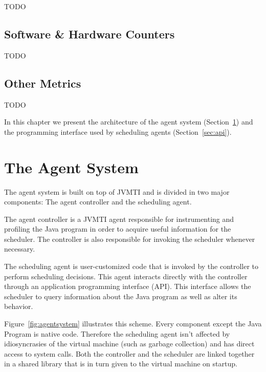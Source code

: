
TODO

\subsection{Software \& Hardware Counters}

TODO

\subsection{Other Metrics}


TODO

\iffalse
In this chapter we present the architecture of the agent system (Section~\ref{sec:agentsystem}) and the programming interface used by scheduling agents (Section~\ref{sec:api}).

\section{The Agent System} \label{sec:agentsystem}

The agent system is built on top of JVMTI and is divided in two major components: The agent controller and the scheduling agent.

The agent controller is a JVMTI agent responsible for instrumenting and profiling the Java program in order to acquire useful information for the scheduler. The controller is also responsible for invoking the scheduler whenever necessary.

The scheduling agent is user-customized code that is invoked by the controller to perform scheduling decisions. This agent interacts directly with the controller through an application programming interface (API). This interface allows the scheduler to query information about the Java program as well as alter its behavior.

Figure~\ref{fig:agentsystem} illustrates this scheme. Every component except the Java Program is native code. Therefore the scheduling agent isn't affected by idiosyncrasies of the virtual machine (such as garbage collection) and has direct access to system calls. Both the controller and the scheduler are linked together in a shared library that is in turn given to the virtual machine on startup.

